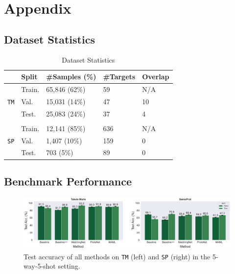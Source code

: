 \section{Appendix}

\subsection{Dataset Statistics}

\begin{table}[h]
    \centering
    \caption{Dataset Statistics}
    \label{tab:data}
    \begin{tabular}{lllll}
        \toprule
        & \textbf{Split} & \textbf{\#Samples} (\%) & \textbf{\#Targets} & \textbf{Overlap} \\
        \midrule
        \multirow{3}{*}{\texttt{TM}} 
        & Train. & 65,846 (62\%) & 59 & N/A \\
        & Val. & 15,031 (14\%) & 47 & 10 \\
        & Test. & 25,083 (24\%) & 37 & 4 \\
        \\
        \multirow{3}{*}{\texttt{SP}} 
        & Train. & 12,141 (85\%) & 636 & N/A \\
        & Val. & 1,407 (10\%) & 159 & 0 \\
        & Test. & 703 (5\%) & 89 & 0 \\
        \bottomrule
    \end{tabular}
\end{table}

\subsection{Benchmark Performance}

\begin{figure}
    \centering
    \includegraphics[width=0.9\linewidth]{../figures/benchmark-perf.pdf}
    \caption{Test accuracy of all methods on \texttt{TM} (left) and \texttt{SP} (right) in the 5-way-5-shot setting.}
    \label{fig:benchmark-perf}
\end{figure}